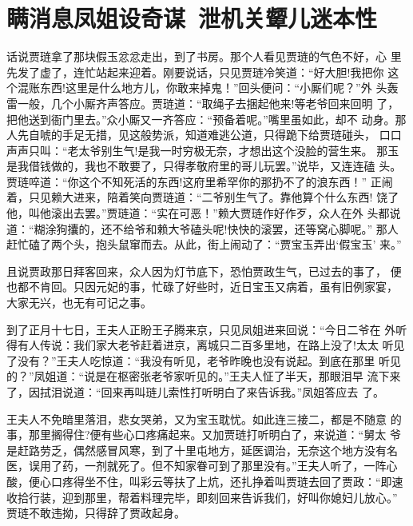 \chapter{瞒消息凤姐设奇谋~泄机关颦儿迷本性}

话说贾琏拿了那块假玉忿忿走出，到了书房。那个人看见贾琏的气色不好，心
里先发了虚了，连忙站起来迎着。刚要说话，只见贾琏冷笑道：“好大胆!我把你
这个混账东西!这里是什么地方儿，你敢来掉鬼！”回头便问：“小厮们呢？”外
头轰雷一般，几个小厮齐声答应。贾琏道：“取绳子去捆起他来!等老爷回来回明
了，把他送到衙门里去。”众小厮又一齐答应：“预备着呢。”嘴里虽如此，却不
动身。那人先自唬的手足无措，见这般势派，知道难逃公道，只得跪下给贾琏碰头，
口口声声只叫：“老太爷别生气!是我一时穷极无奈，才想出这个没脸的营生来。
那玉是我借钱做的，我也不敢要了，只得孝敬府里的哥儿玩罢。”说毕，又连连磕
头。贾琏啐道：“你这个不知死活的东西!这府里希罕你的那扔不了的浪东西！”
正闹着，只见赖大进来，陪着笑向贾琏道：“二爷别生气了。靠他算个什么东西!
饶了他，叫他滚出去罢。”贾琏道：“实在可恶！”赖大贾琏作好作歹，众人在外
头都说道：“糊涂狗攮的，还不给爷和赖大爷磕头呢!快快的滚罢，还等窝心脚呢。”
那人赶忙磕了两个头，抱头鼠窜而去。从此，街上闹动了：“贾宝玉弄出‘假宝玉’
来。”

且说贾政那日拜客回来，众人因为灯节底下，恐怕贾政生气，已过去的事了，
便也都不肯回。只因元妃的事，忙碌了好些时，近日宝玉又病着，虽有旧例家宴，
大家无兴，也无有可记之事。

到了正月十七日，王夫人正盼王子腾来京，只见凤姐进来回说：“今日二爷在
外听得有人传说：我们家大老爷赶着进京，离城只二百多里地，在路上没了!太太
听见了没有？”王夫人吃惊道：“我没有听见，老爷昨晚也没有说起。到底在那里
听见的？”凤姐道：“说是在枢密张老爷家听见的。”王夫人怔了半天，那眼泪早
流下来了，因拭泪说道：“回来再叫琏儿索性打听明白了来告诉我。”凤姐答应去
了。

王夫人不免暗里落泪，悲女哭弟，又为宝玉耽忧。如此连三接二，都是不随意
的事，那里搁得住?便有些心口疼痛起来。又加贾琏打听明白了，来说道：“舅太
爷是赶路劳乏，偶然感冒风寒，到了十里屯地方，延医调治，无奈这个地方没有名
医，误用了药，一剂就死了。但不知家眷可到了那里没有。”王夫人听了，一阵心
酸，便心口疼得坐不住，叫彩云等扶了上炕，还扎挣着叫贾琏去回了贾政：“即速
收拾行装，迎到那里，帮着料理完毕，即刻回来告诉我们，好叫你媳妇儿放心。”
贾琏不敢违拗，只得辞了贾政起身。

